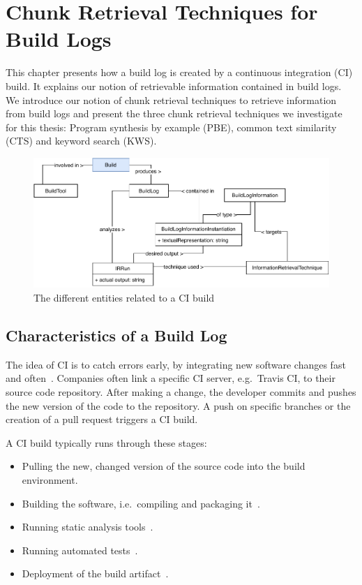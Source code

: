 \documentclass[\myrootdir/main.tex]{subfiles}
\begin{document}
\chapter{Chunk Retrieval Techniques for Build Logs}
\label{sec:techniques}
This chapter presents how a build log is created by a continuous integration (CI) build.
It explains our notion of retrievable information contained in build logs.
We introduce our notion of chunk retrieval techniques to retrieve information from build logs and present the three chunk retrieval techniques we investigate for this thesis:
Program synthesis by example (PBE), common text similarity (CTS) and keyword search (KWS).

\begin{figure}[htbp]
	\centering
	\includegraphics[width=\textwidth, clip]{img/build-overview.pdf}
	\caption{The different entities related to a CI build}
	\label{fig:build-overview}
\end{figure}

\section{Characteristics of a Build Log}
\label{sec:bl-characteristics}
The idea of CI is to catch errors early, by integrating new software changes fast and often~\cite{humble2010continuous}.
Companies often link a specific CI server, e.g.\ Travis CI, to their source code repository.
After making a change, the developer commits and pushes the new version of the code to the repository.
A push on specific branches or the creation of a pull request triggers a CI build.

A CI build typically runs through these stages:
\begin{itemize}
	\item Pulling the new, changed version of the source code into the build environment.
	\item Building the software, i.e.\ compiling and packaging it~\cite{phillips2014understanding}.
	\item Running static analysis tools~\cite{zampetti2017open}.
	\item Running automated tests~\cite{beller2017oops}.
	\item Deployment of the build artifact~\cite{schermann2016empirical}.
\end{itemize}
\end{document}
